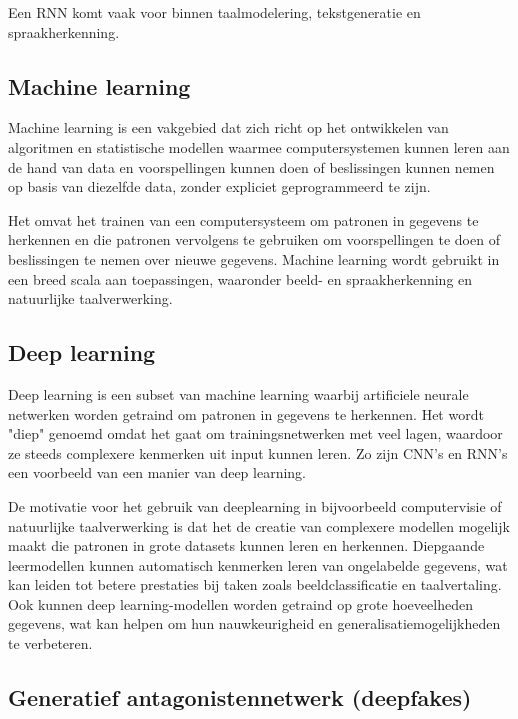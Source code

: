 Een RNN komt vaak voor binnen taalmodelering, tekstgeneratie en spraakherkenning.

\cite{schmidt2019recurrent}

\subsection{Machine learning}

Machine learning is een vakgebied dat zich richt op het ontwikkelen van algoritmen en statistische modellen waarmee computersystemen kunnen leren aan de hand van data en voorspellingen kunnen doen of beslissingen kunnen nemen op basis van diezelfde data, zonder expliciet geprogrammeerd te zijn. 

Het omvat het trainen van een computersysteem om patronen in gegevens te herkennen en die patronen vervolgens te gebruiken om voorspellingen te doen of beslissingen te nemen over nieuwe gegevens. Machine learning wordt gebruikt in een breed scala aan toepassingen, waaronder beeld- en spraakherkenning en natuurlijke taalverwerking.

\cite{biamonte2017quantum}

\subsection{Deep learning}

Deep learning is een subset van machine learning waarbij artificiele neurale netwerken worden getraind om patronen in gegevens te herkennen. Het wordt "diep" genoemd omdat het gaat om trainingsnetwerken met veel lagen, waardoor ze steeds complexere kenmerken uit input kunnen leren. Zo zijn CNN's en RNN's een voorbeeld van een manier van deep learning.

De motivatie voor het gebruik van deeplearning in bijvoorbeeld computervisie of natuurlijke taalverwerking is dat het de creatie van complexere modellen mogelijk maakt die patronen in grote datasets kunnen leren en herkennen. Diepgaande leermodellen kunnen automatisch kenmerken leren van ongelabelde gegevens, wat kan leiden tot betere prestaties bij taken zoals beeldclassificatie en taalvertaling. Ook kunnen deep learning-modellen worden getraind op grote hoeveelheden gegevens, wat kan helpen om hun nauwkeurigheid en generalisatiemogelijkheden te verbeteren.

\cite{yan2015deep}

\subsection{Generatief antagonistennetwerk (deepfakes)}

